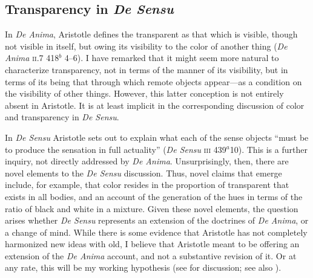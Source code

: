 \documentclass[12pt]{article}
\begin{document}

\subsection{Transparency in \emph{De Sensu}} %
\label{sub:transparency_in_de_sensu}

In \emph{De Anima}, Aristotle defines the transparent as that which is visible, though not visible in itself, but owing its visibility to the color of another thing (\emph{De Anima} \textsc{ii}.7 418\( ^{b} \) 4--6). I have remarked that it might seem more natural to characterize transparency, not in terms of the manner of its visibility, but in terms of its being that through which remote objects appear---as a condition on the visibility of other things. However, this latter conception is not entirely absent in Aristotle. It is at least implicit in the corresponding discussion of color and transparency in \emph{De Sensu}.

In \emph{De Sensu} Aristotle sets out to explain what each of the sense objects ``must be to produce the sensation in full actuality'' (\emph{De Sensu} \textsc{iii} 439\( ^{a} \)10). This is a further inquiry, not directly addressed by \emph{De Anima}. Unsurprisingly, then, there are novel elements to the \emph{De Sensu} discussion. Thus, novel claims that emerge include, for example, that color resides in the proportion of transparent that exists in all bodies, and an account of the generation of the hues in terms of the ratio of black and white in a mixture. Given these novel elements, the question arises whether \emph{De Sensu} represents an extension of the doctrines of \emph{De Anima}, or a change of mind. While there is some evidence that Aristotle has not completely harmonized new ideas with old, I believe that Aristotle meant to be offering an extension of the \emph{De Anima} account, and not a substantive revision of it. Or at any rate, this will be my working hypothesis (see \citealt{Kahn:1966zr} for discussion; see also \citealt[291]{Caston:2005cr} \citealt[37]{Nussbaum:1995ly}).
\end{document}
